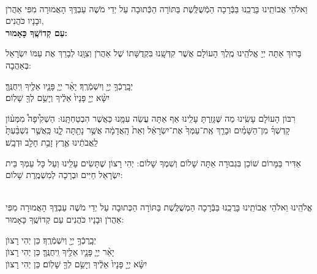 \documentclass[twoside, openany, parskip=half, 11pt]{book}
\begin{document}
\begin{sometimes}


\\
\shatz {}
וֵאלֹהֵי אֲבוֹתֵֽינוּ בָּרֲכֵֽנוּ בַּבְּֿרָכָה הַמְֿשֻׁלֶּֽשֶׁת בַּתּוֹרָה הַכְּֿתוּבָה עַל יְדֵי מֹשֶׁה עַבְדֶּֽךָ הָאֲמוּרָה מִפִּי אַהֲרֹן וּבָנָיו כֹּהֲנִים,\\
\textbf{עַם קְדוֹשֶֽׁךָ כָּאָמוּר:}

בָּרוּךְ אַתָּה יְיָ אֱלֹהֵֽינוּ מֶֽלֶךְ הָעוֹלָם אֲשֶׁר קִדְּשָֽׁנוּ בִּקְדֻשָּׁתוֹ שֶׁל אַהֲרֹן  וְצִוָּֽנוּ לְבָרֵךְ אֶת עַמּוֹ יִשְׂרָאֵל בְּאַהֲבָה:

יְבָֽרֶכְֿךָ֥ יְיָ֖ וְיִשְׁמְֿרֶֽךָ׃ \quad יָאֵ֨ר יְיָ֧ פָּנָ֛יו אֵלֶ֖יךָ וִֽיחֻנֶּֽךָּ׃\\ יִשָּׂ֨א יְיָ֤ פָּנָיו֙ אֵלֶ֔יךָ וְיָשֵׂ֥ם לְךָ֖ שָׁלֽוֹם׃ 

\nextpage

\begin{paracol}{2}
רִבּוֹן הָעוֹלָם עָשִֽׂינוּ מַה שֶּׁגָּזַֽרְתָּ עָלֵֽינוּ אַף אַתָּה עֲשֵׂה עִמָּֽנוּ כַּאֲשֶׁר הִבְטַחְתָּֽנוּ:  הַשְׁקִ֩יפָה֩ מִמְּע֨וֹן קָדְשְׁךָ֜ מִן־הַשָּׁמַ֗יִם וּבָרֵ֤ךְ אֶֽת־עַמְּךָ֙ אֶת־יִשְׂרָאֵ֔ל וְאֵת֙ הָֽאֲדָמָ֔ה אֲשֶׁ֥ר נָתַ֖תָּה לָ֑נוּ כַּֽאֲשֶׁ֤ר נִשְׁבַּ֨עְתָּ֙ לַֽאֲבֹתֵ֔ינוּ אֶ֛רֶץ זָבַ֥ת חָלָ֖ב וּדְבָֽשׁ׃

\switchcolumn

\kahal
אַדִּיר בַּמָּרוֹם שׁוֹכֵן בִּגְבוּרָה אַתָּה שָׁלוֹם וְשִׁמְךָ שָׁלוֹם: יְהִי רָצוֹן שֶׁתָּשִׂים עָלֵֽינוּ וְעַל כָּל עַמְּךָ בֵּית יִשְׂרָאֵל חַיִּים וּבְרָכָה לְמִשְׁמֶֽרֶת שָׁלוֹם:
\end{paracol}

\sepline

\\
 אֱלֹהֵֽינוּ וֵאלֹהֵי אֲבוֹתֵֽינוּ בָּרֲכֵֽנוּ בַּבְּֿרָכָה הַמְשֻׁלֶּֽשֶׁת בַּתּוֹרָה 
הַכְּתוּבָה עַל יְדֵי מֹשֶׁה עַבְדֶּֽךָ הָאֲמוּרָה מִפִּי אַהֲרֹן וּבָנָיו כֹּהֲנִים עַם קְדוֹשֶֽׁךָ כָּאָמוּר: 

	יְבָֽרֶכְֿךָ֥ יְיָ֖ 	וְיִשְׁמְֿרֶֽךָ׃ \hfill \kahal כֵּן יְהִי רָצוׂן \\
	יָאֵ֨ר יְיָ֧ פָּנָ֛יו אֵלֶ֖יךָ וִֽיחֻנֶּֽךָּ׃ \hfill \kahal כֵּן יְהִי רָצוׂן \\
 יִשָּׂ֨א יְיָ֤ פָּנָיו֙ אֵלֶ֔יךָ וְיָשֵׂ֥ם לְךָ֖ שָׁלֽוֹם׃ \hfill \kahal כֵּן יְהִי רָצוׂן

\end{sometimes}
\end{document}
